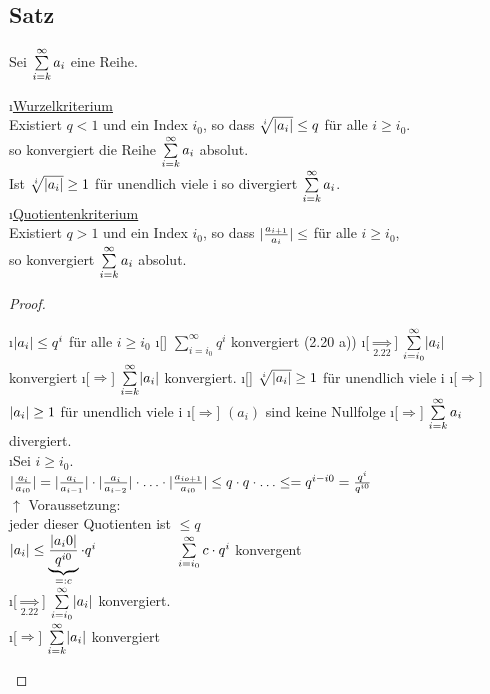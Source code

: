 \subsection[Satz: Wurzel- und Quotientenkriterium]{Satz}
Sei $\sum\limits_{i=k}^{\infty} a_i$ eine Reihe.\\
\begin{enumerate}[a)]
\i \underline{Wurzelkriterium}\\
Existiert $q < 1$ und ein Index $i_0$, so dass $\sqrt[i]{\lvert a_i \rvert} \leq q$ für alle $i \geq i_0$.\\
so konvergiert die Reihe $\sum\limits_{i=k}^{\infty} a_i$ absolut.\\
Ist $\sqrt[i]{\lvert a_i \rvert} \geq 1$ für unendlich viele i so divergiert $\sum\limits_{i=k}^{\infty} a_i$.\\
\i \underline{Quotientenkriterium}\\
Existiert $q > 1$ und ein Index $i_0$, so dass $\lvert \frac{a_{i+1}}{a_i }  \rvert \leq$ für alle $i \geq i_0$,\\
so konvergiert $\sum\limits_{i=k}^{\infty} a_i$ absolut. 
\end{enumerate}
\begin{proof}
\begin{enumerate}[a)]
\i $\lvert a_i \rvert \leq q^i$ für alle $i \geq i_0$
\i[] $\sum\limits_{i=i_0}^{\infty} q^i$ konvergiert (2.20 a)) 
\i[$\underset{2.22}{\Rightarrow}$] $\sum\limits_{i=i_0}^{\infty} \lvert a_i \rvert$ konvergiert
\i[$\Rightarrow$] $\sum\limits_{i=k}^{\infty} \lvert a_i \rvert$ konvergiert.
\i[] $\sqrt[i]{\lvert a_i \rvert} \geq 1$ für unendlich viele i
\i[$\Rightarrow$] $\lvert a_i \rvert \geq 1$ für unendlich viele i
\i[$\Rightarrow$] $(a_i)$ sind keine Nullfolge
\i[$\Rightarrow$] $\sum\limits_{i=k}^{\infty} a_i$ divergiert.\\
\i Sei $i \geq i_0$.\\
$\lvert \frac{a_i}{a_{i0}} \rvert = \lvert \frac{a_i}{a_{i-1}} \rvert \cdot \lvert \frac{a_i}{a_{i-2}} \rvert \cdot \ldots \cdot \lvert \frac{a_{io+1}}{a_{i0} }  \rvert \leq q \cdot q \cdot \ldots \leq = q^{i-i0} = \frac{q^i}{q^{i0}}$\\
\hspace*{5.55cm} $\uparrow$ Voraussetzung: \\
\hspace*{5cm} jeder dieser Quotienten ist $\leq q$\\
$\lvert a_i \rvert \leq \underbrace{\frac{\lvert a_i0 \rvert}{q^{i0}}}_{=:c} \cdot q^i \hspace*{2cm} \sum\limits_{i=i_0}^{\infty} c \cdot q^i$ konvergent\\
\i[$\underset{2.22}{\Rightarrow}$] $\sum\limits_{i=i_0}^{\infty} \lvert a_i \rvert$ konvergiert.\\
\i[$\Rightarrow$] $\sum\limits_{i=k}^{\infty} \lvert a_i \rvert$ konvergiert
\end{enumerate}
\end{proof}
